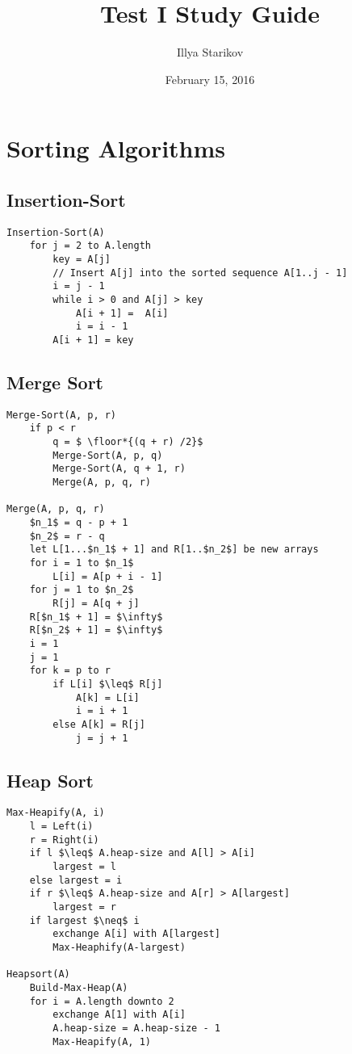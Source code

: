 \documentclass{article}
\DeclarePairedDelimiter\floor{\lfloor}{\rfloor}
\begin{document}
\title{Test I Study Guide}
\author{Illya Starikov}
\date{February 15, 2016}
\maketitle


\section{Sorting Algorithms}
\subsection{Insertion-Sort}
\begin{Verbatim}[commandchars=\\\{\},codes={\catcode`$=3\catcode`_=8}]
Insertion-Sort(A)
    for j = 2 to A.length
        key = A[j]
        // Insert A[j] into the sorted sequence A[1..j - 1]
        i = j - 1
        while i > 0 and A[j] > key
            A[i + 1] =  A[i]
            i = i - 1
        A[i + 1] = key
\end{Verbatim}

\subsection{Merge Sort}
\begin{Verbatim}[commandchars=\\\{\},codes={\catcode`$=3\catcode`_=8}]
Merge-Sort(A, p, r)
    if p < r
        q = $ \floor*{(q + r) /2}$
        Merge-Sort(A, p, q)
        Merge-Sort(A, q + 1, r)
        Merge(A, p, q, r)

Merge(A, p, q, r)
    $n_1$ = q - p + 1
    $n_2$ = r - q
    let L[1...$n_1$ + 1] and R[1..$n_2$] be new arrays
    for i = 1 to $n_1$
        L[i] = A[p + i - 1]
    for j = 1 to $n_2$
        R[j] = A[q + j]
    R[$n_1$ + 1] = $\infty$
    R[$n_2$ + 1] = $\infty$
    i = 1
    j = 1
    for k = p to r
        if L[i] $\leq$ R[j]
            A[k] = L[i]
            i = i + 1
        else A[k] = R[j]
            j = j + 1
\end{Verbatim}

\subsection{Heap Sort}
\begin{Verbatim}[commandchars=\\\{\},codes={\catcode`$=3\catcode`_=8}]
Max-Heapify(A, i)
    l = Left(i)
    r = Right(i)
    if l $\leq$ A.heap-size and A[l] > A[i]
        largest = l
    else largest = i
    if r $\leq$ A.heap-size and A[r] > A[largest]
        largest = r
    if largest $\neq$ i
        exchange A[i] with A[largest]
        Max-Heaphify(A-largest)

Heapsort(A)
    Build-Max-Heap(A)
    for i = A.length downto 2
        exchange A[1] with A[i]
        A.heap-size = A.heap-size - 1
        Max-Heapify(A, 1)
\end{Verbatim}
\end{document}
